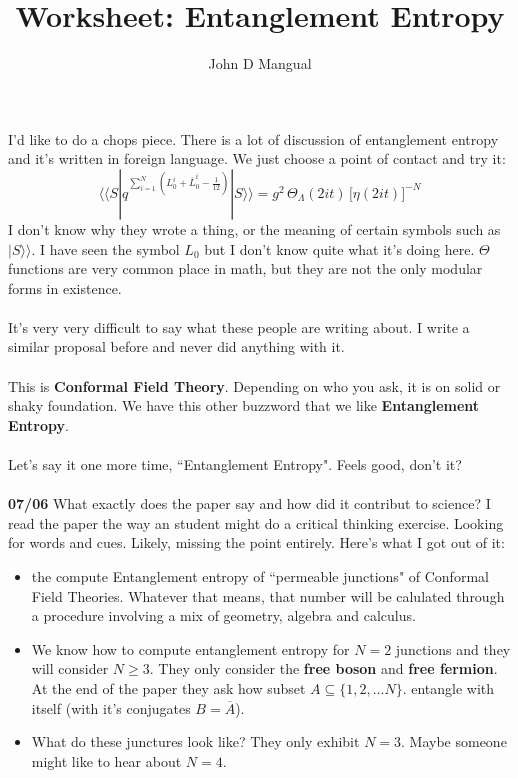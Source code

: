\documentclass[12pt]{article}
\title{Worksheet: Entanglement Entropy}
\author{John D Mangual}
\date{}
\begin{document}
\selectfont \fontsize{12.5}{15}\selectfont

\maketitle

\noindent I'd like to do a chops piece.  There is a lot of discussion of entanglement entropy and it's written in foreign language.  We just choose a point of contact and try it:
$$ \langle \langle S | q^{\sum_{i=1}^N (L^i_0 + \overline{L}^i_0 - \frac{1}{12} ) }   | S \rangle \rangle = g^2 \, \Theta_\Lambda (2it) \, \big[\eta(2it) \big]^{-N} $$
I don't know why they wrote a thing, or the meaning of certain symbols such as $| S \rangle\rangle$.   I have seen the symbol $L_0$ but I don't know quite what it's doing here.  $\Theta$ functions are very common place in math, but they are not the only modular forms in existence. \\ \\
It's very very difficult to say what these people are writing about.  I write a similar proposal before and never did anything with it. \\ \\
This is \textbf{Conformal Field Theory}.  Depending on who you ask, it is on solid or shaky foundation. We have this other buzzword that we like {\color{red!50!yellow!50!green}\textbf{Entanglement Entropy}}. \\ \\
Let's say it one more time, ``Entanglement Entropy".  Feels good, don't it? \\ \\
\textbf{07/06} What exactly does the paper say and how did it contribut to science?  I read the paper the way an student might do a critical thinking exercise.  Looking for words and cues.   Likely, missing the point entirely. Here's what I got out of it:
\begin{itemize}
\item the compute Entanglement entropy of ``permeable junctions" of Conformal Field Theories. Whatever that means, that number will be calulated through a procedure involving a mix of geometry, algebra and calculus.  
\item We know how to compute entanglement entropy for $N = 2$ junctions and they will consider $N \geq 3$.  They only consider the \textbf{free boson}  and \textbf{free fermion}.  At the end of the paper they ask how subset $A \subseteq \{ 1, 2, \dots N\}$. entangle with itself (with it's conjugates $B = \overline{A}$).
\item What do these junctures look like? They only exhibit $N = 3$.  Maybe someone might like to hear about $N=4$.
\end{itemize}
\end{document}
